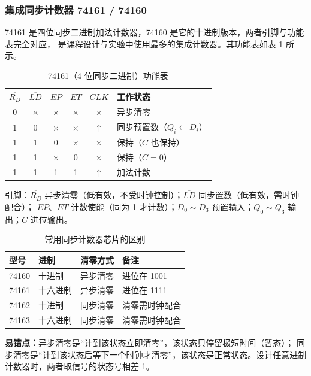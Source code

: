 \subsubsection{集成同步计数器 74161 / 74160}
74161 是四位同步二进制加法计数器，74160 是它的十进制版本，两者引脚与功能表完全对应，
是课程设计与实验中使用最多的集成计数器。其功能表如表 \ref{tab:74161} 所示。

\begin{table}[!htbp]
\centering
\caption{74161（4 位同步二进制）功能表}
\label{tab:74161}
\begin{tabular}{cccc|c|l}
\toprule
$\overline{R_D}$ & $\overline{LD}$ & $EP$ & $ET$ & $CLK$ & 工作状态 \\
\midrule
0 & $\times$ & $\times$ & $\times$ & $\times$ & 异步清零 \\
1 & 0 & $\times$ & $\times$ & $\uparrow$ & 同步预置数（$Q_i\leftarrow D_i$） \\
1 & 1 & 0 & $\times$ & $\times$ & 保持（$C$ 也保持） \\
1 & 1 & $\times$ & 0 & $\times$ & 保持（$C=0$） \\
1 & 1 & 1 & 1 & $\uparrow$ & 加法计数 \\
\bottomrule
\end{tabular}
\end{table}

\noindent 引脚：$\overline{R_D}$ 异步清零（低有效，不受时钟控制）；$\overline{LD}$ 同步置数（低有效，需时钟配合）；
$EP$、$ET$ 计数使能（同为 1 才计数）；$D_0\sim D_3$ 预置输入；$Q_0\sim Q_3$ 输出；$C$ 进位输出。

\begin{table}[!htbp]
\centering
\caption{常用同步计数器芯片的区别}
\begin{tabular}{llll}
\toprule
型号 & 进制 & 清零方式 & 备注 \\
\midrule
74160 & 十进制 & 异步清零 & 进位在 1001 \\
74161 & 十六进制 & 异步清零 & 进位在 1111 \\
74162 & 十进制 & 同步清零 & 清零需时钟配合 \\
74163 & 十六进制 & 同步清零 & 清零需时钟配合 \\
\bottomrule
\end{tabular}
\end{table}

\noindent\textbf{易错点：}异步清零是“计到该状态立即清零”，该状态只停留极短时间（暂态）；
同步清零是“计到该状态后等下一个时钟才清零”，该状态是正常状态。设计任意进制计数器时，两者取信号的状态号相差 1。

